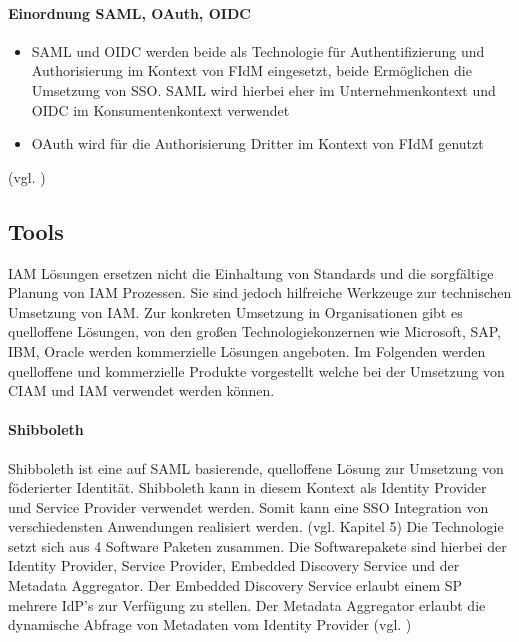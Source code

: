 \documentclass[11pt]{article}
\begin{document}
\paragraph{Einordnung SAML, OAuth, OIDC}
\begin{itemize}
  \item SAML und OIDC werden beide als Technologie für Authentifizierung und Authorisierung im Kontext von FIdM eingesetzt, beide Ermöglichen die Umsetzung von SSO. SAML wird hierbei eher im Unternehmenkontext und OIDC im Konsumentenkontext verwendet
  \item OAuth wird für die Authorisierung Dritter im Kontext von FIdM genutzt
\end{itemize}
(vgl. \cite{naik2017choice})
\subsection{Tools}
IAM Lösungen ersetzen nicht die Einhaltung von Standards und die sorgfältige Planung von IAM Prozessen. Sie sind jedoch hilfreiche Werkzeuge zur technischen Umsetzung von IAM. Zur konkreten Umsetzung in Organisationen gibt es quelloffene Lösungen, von den großen Technologiekonzernen wie Microsoft, SAP, IBM, Oracle werden kommerzielle Lösungen angeboten. Im Folgenden werden quelloffene und kommerzielle Produkte vorgestellt welche bei der Umsetzung von CIAM und IAM verwendet werden können.
\paragraph{Shibboleth}
Shibboleth ist eine auf SAML basierende, quelloffene Lösung zur Umsetzung von föderierter Identität. Shibboleth kann in diesem Kontext als Identity Provider und Service Provider verwendet werden. Somit kann eine SSO Integration von verschiedensten Anwendungen realisiert werden. (vgl. \cite{kamal2015shibboleth} Kapitel 5) Die Technologie setzt sich aus 4 Software Paketen zusammen. Die Softwarepakete sind hierbei der Identity Provider, Service Provider, Embedded Discovery Service und der Metadata Aggregator. Der Embedded Discovery Service erlaubt einem SP mehrere IdP's zur Verfügung zu stellen. Der Metadata Aggregator erlaubt die dynamische Abfrage von Metadaten vom Identity Provider (vgl. \cite{shibboleth2024software})
\end{document}
